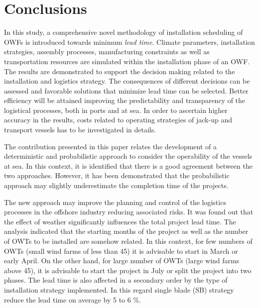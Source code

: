 \section{Conclusions}
\label{conclusions}


In this study, a comprehensive novel methodology of installation scheduling of OWFs is introduced towards minimum \textit{lead time}. Climate parameters, installation strategies, assembly processes, manufacturing constraints as well as transportation resources are simulated within the installation phase of an OWF. The results are demonstrated to support the decision making related to the installation and logistics strategy. The consequences of different decisions can be assessed and favorable solutions that minimize lead time can be selected. Better efficiency will be attained improving the predictability and transparency of the logistical processes, both in ports and at sea. In order to ascertain higher accuracy in the results, costs related to operating strategies of jack-up and transport vessels has to be investigated in details.

The contribution presented in this paper relates the development of a deterministic and probabilistic approach to consider the operability of the vessels at sea. In this context, it is identified that there is a good agreement between the two approaches. However, it has been demonstrated that the probabilistic approach may slightly underestimate the completion time of the projects.

The new approach may improve the planning and control of the logistics processes in the offshore industry reducing associated risks. It was found out that the effect of weather significantly influences the total project lead time. The analysis indicated that the starting months of the project as well as the number of OWTs to be installed are somehow related. In this context, for few numbers of OWTs (small wind farms of less than 45) it is advisable to start in March or early April. On the other hand, for large number of OWTs (large wind farms above 45), it is advisable to start the project in July or split the project into two phases. The lead time is also affected in a secondary order by the type of installation strategy implemented. In this regard single blade (SB) strategy reduce the lead time on average by 5 to 6 \%.



